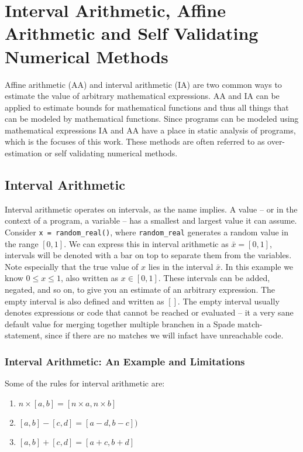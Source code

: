 \section{Interval Arithmetic, Affine Arithmetic and Self Validating Numerical Methods}
\label{sec:IAndAA}

Affine arithmetic (AA) and interval arithmetic (IA) are two common ways to estimate the value of arbitrary mathematical expressions. AA and IA can be applied to estimate bounds for mathematical functions and thus all things that can be modeled by mathematical functions. Since programs can be modeled using mathematical expressions IA and AA have a place in static analysis of programs, which is the focuses of this work. These methods are often referred to as over-estimation or self validating numerical methods. \cite{src:affAri}

\subsection{Interval Arithmetic}
Interval arithmetic operates on intervals, as the name implies. A value -- or in the context of a program, a variable -- has a smallest and largest value it can assume. Consider \verb`x = random_real()`, where \verb`random_real` generates a random value in the range $[0, 1]$. We can express this in interval arithmetic as $\bar{x} = [0, 1]$, intervals will be denoted with a bar on top to separate them from the variables. Note especially that the true value of $x$ lies in the interval $\bar{x}$. In this example we know $0 \leq x \leq 1$, also written as $x \in [0, 1]$. These intervals can be added, negated, and so on, to give you an estimate of an arbitrary expression. The empty interval is also defined and written as $[]$. The empty interval usually denotes expressions or code that cannot be reached or evaluated -- it a very sane default value for merging together multiple branchen in a Spade match-statement, since if there are no matches we will infact have unreachable code.

\subsubsection{Interval Arithmetic: An Example and Limitations}
Some of the rules for interval arithmetic are:
\begin{enumerate}
  \item $n \times [a, b] = [n \times a, n \times b]$
  \item $[a, b] - [c, d] = [a - d, b - c])$
  \item $[a, b] + [c, d] = [a + c, b + d]$
\end{enumerate}

